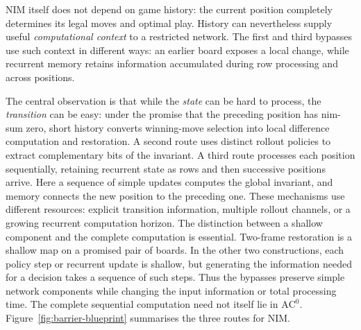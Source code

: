 \documentclass[twoside,11pt]{article}
\newcommand{\AC}{\mathrm{AC}}
\numberwithin{theorem}{section}
\numberwithin{equation}{section}
\begin{document}
NIM itself does not depend on game history: the current position completely determines its legal moves and optimal play. History can nevertheless supply useful \emph{computational context} to a restricted network. The first and third bypasses use such context in different ways: an earlier board exposes a local change, while recurrent memory retains information accumulated during row processing and across positions.

The central observation is that while the \emph{state} can be hard to process, the \emph{transition} can be easy: under the promise that the preceding position has nim-sum zero, short history converts winning-move selection into local difference computation and restoration.
A second route uses distinct rollout policies to extract complementary bits of the invariant.
A third route processes each position sequentially, retaining recurrent state as rows and then successive positions arrive. Here a sequence of simple updates computes the global invariant, and memory connects the new position to the preceding one.
These mechanisms use different resources: explicit transition information, multiple rollout channels, or a growing recurrent computation horizon.
The distinction between a shallow component and the complete computation is essential. Two-frame restoration is a shallow map on a promised pair of boards. In the other two constructions, each policy step or recurrent update is shallow, but generating the information needed for a decision takes a sequence of such steps. Thus the bypasses preserve simple network components while changing the input information or total processing time. The complete sequential computation need not itself lie in $\AC^0$.
Figure~\ref{fig:barrier-blueprint} summarises the three routes for NIM.
\end{document}
